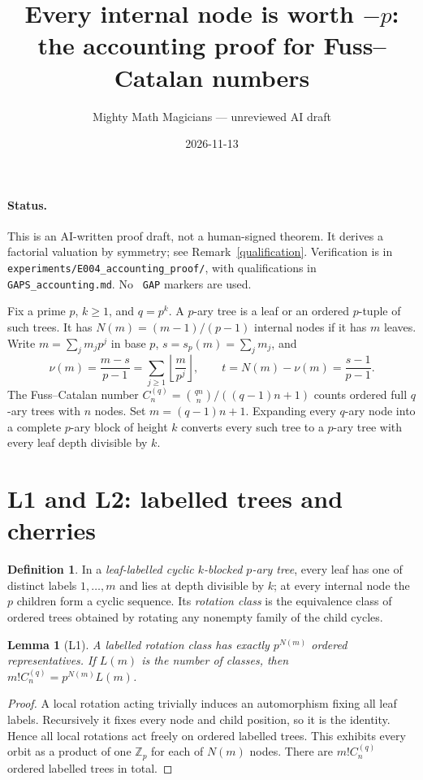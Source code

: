 \documentclass[10pt]{article}
\title{Every internal node is worth $-p$:\\the accounting proof for Fuss--Catalan numbers}
\author{Mighty Math Magicians --- unreviewed AI draft}
\date{2026-11-13}
\newtheorem{lemma}{Lemma}
\theoremstyle{definition}\newtheorem*{definition}{Definition}
\theoremstyle{remark}\newtheorem*{remark}{Remark}
\begin{document}
\maketitle
\paragraph{Status.} This is an AI-written proof draft, not a human-signed theorem.
It derives a factorial valuation by symmetry; see Remark~\ref{qualification}.
Verification is in \texttt{experiments/E004\_accounting\_proof/}, with
qualifications in \texttt{GAPS\_accounting.md}. No \texttt{ GAP} markers
are used.

Fix a prime $p$, $k\ge1$, and $q=p^k$. A $p$-ary tree is a leaf or an ordered
$p$-tuple of such trees. It has $N(m)=(m-1)/(p-1)$ internal nodes if it has $m$
leaves. Write $m=\sum_jm_jp^j$ in base $p$, $s=s_p(m)=\sum_jm_j$, and
\[
 \nu(m)=\frac{m-s}{p-1}=\sum_{j\ge1}\left\lfloor\frac m{p^j}\right\rfloor,
 \qquad t=N(m)-\nu(m)=\frac{s-1}{p-1}.
\]
The Fuss--Catalan number $C_n^{(q)}=\binom{qn}{n}/((q-1)n+1)$ counts ordered
full $q$-ary trees with $n$ nodes. Set $m=(q-1)n+1$. Expanding every $q$-ary
node into a complete $p$-ary block of height $k$ converts every such tree to
a $p$-ary tree with every leaf depth divisible by $k$.

\section{L1 and L2: labelled trees and cherries}
\begin{definition} In a \emph{leaf-labelled cyclic $k$-blocked $p$-ary tree},
every leaf has one of distinct labels $1,\ldots,m$ and lies at depth divisible
by $k$; at every internal node the $p$ children form a cyclic sequence. Its
\emph{rotation class} is the equivalence class of ordered trees obtained by
rotating any nonempty family of the child cycles.\end{definition}
\begin{lemma}[L1]\label{L1} A labelled rotation class has exactly $p^{N(m)}$
ordered representatives. If $L(m)$ is the number of classes, then
$m!C_n^{(q)}=p^{N(m)}L(m)$.\end{lemma}
\begin{proof} A local rotation acting trivially induces an automorphism fixing
all leaf labels. Recursively it fixes every node and child position, so it is
the identity. Hence all local rotations act freely on ordered labelled trees.
This exhibits every orbit as a product of one $\mathbb Z_p$ for each of $N(m)$
nodes. There are $m!C_n^{(q)}$ ordered labelled trees in total.\end{proof}
\end{document}
